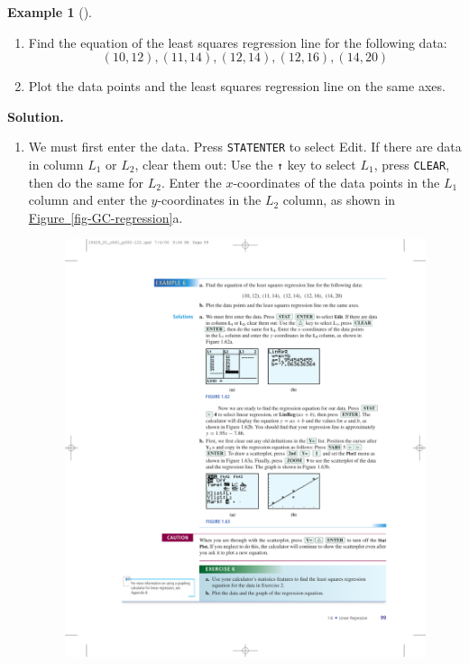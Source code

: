 \documentclass[10pt,]{book}
\theoremstyle{plain}
\theoremstyle{definition}
\theoremstyle{definition}
\newtheorem{example}[theorem]{Example}
\theoremstyle{definition}
\theoremstyle{definition}
\numberwithin{equation}{part}
\begin{document}
\begin{example}[]\label{example-GC-regression}
\leavevmode%
\begin{enumerate}[label=*\alph**]
\item\hypertarget{li-1330}{}Find the equation of the least squares regression line for the following data:%
\begin{equation*}
(10, 12), (11, 14), (12, 14), (12, 16), (14, 20)
\end{equation*}
%
\item\hypertarget{li-1331}{}Plot the data points and the least squares regression line on the same axes.%
\end{enumerate}
%
\par\medskip\noindent%
\textbf{Solution.}\quad \leavevmode%
\begin{enumerate}[label=*\alph**]
\item\hypertarget{li-1332}{}We must first enter the data. Press \lstinline?STAT?\lstinline?ENTER? to select Edit. If there are data in column \(L_1\) or \(L_2\), clear them out: Use the \lstinline?↑? key to select \(L_1\), press \lstinline?CLEAR?, then do the same for \(L_2\). Enter the \(x\)-coordinates of the data points in the \(L_1\) column and enter the \(y\)-coordinates in the \(L_2\) column, as shown in \hyperref[fig-GC-regression]{Figure~\ref{fig-GC-regression}}a. \begin{figure}
\centering
\includegraphics[width=0.8\linewidth]{images/fig-GC-regression}

\end{figure}
\end{enumerate}
\end{example}
\end{document}
